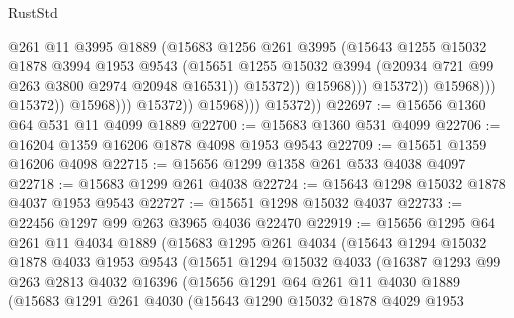 \begin{lexlean}{RustStd}
\begin{coremodule}
                                            @261
                                            @11
                                            @3995
                                            @1889
                                            (@15683
                                              @1256
                                              @261
                                              @3995
                                              (@15643
                                                @1255
                                                @15032
                                                @1878
                                                @3994
                                                @1953
                                                @9543
                                                (@15651
                                                  @1255
                                                  @15032
                                                  @3994
                                                  (@20934 @721 @99 @263 @3800 @2974 @20948 @16531))
                                                @15372))
                                            @15968)))
                                      @15372))
                                  @15968)))
                            @15372))
                        @15968)))
                  @15372))
              @15968)))
        @15372))
@22697 := @15656 @1360 @64 @531 @11 @4099 @1889
@22700 := @15683 @1360 @531 @4099
@22706 := @16204 @1359 @16206 @1878 @4098 @1953 @9543
@22709 := @15651 @1359 @16206 @4098
@22715 := @15656 @1299 @1358 @261 @533 @4038 @4097
@22718 := @15683 @1299 @261 @4038
@22724 := @15643 @1298 @15032 @1878 @4037 @1953 @9543
@22727 := @15651 @1298 @15032 @4037
@22733 := @22456 @1297 @99 @263 @3965 @4036 @22470
@22919 := @15656
    @1295
    @64
    @261
    @11
    @4034
    @1889
    (@15683
      @1295
      @261
      @4034
      (@15643
        @1294
        @15032
        @1878
        @4033
        @1953
        @9543
        (@15651
          @1294
          @15032
          @4033
          (@16387
            @1293
            @99
            @263
            @2813
            @4032
            @16396
            (@15656
              @1291
              @64
              @261
              @11
              @4030
              @1889
              (@15683
                @1291
                @261
                @4030
                (@15643
                  @1290
                  @15032
                  @1878
                  @4029
                  @1953

\end{coremodule}
\end{lexlean}
